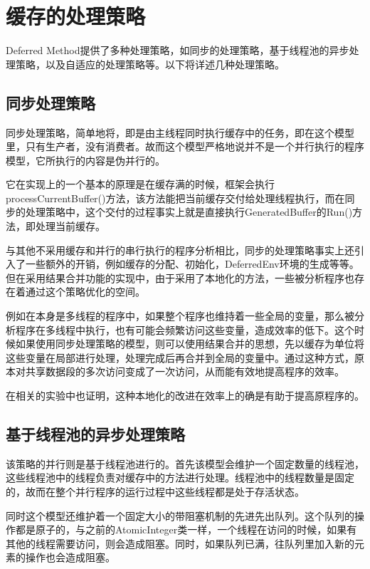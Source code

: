 \section{缓存的处理策略}

Deferred Method提供了多种处理策略，如同步的处理策略，基于线程池的异步处理策略，以及自适应的处理策略等。以下将详述几种处理策略。

\subsection{同步处理策略}

同步处理策略，简单地将，即是由主线程同时执行缓存中的任务，即在这个模型里，只有生产者，没有消费者。故而这个模型严格地说并不是一个并行执行的程序模型，它所执行的内容是伪并行的。

它在实现上的一个基本的原理是在缓存满的时候，框架会执行processCurrentBuffer()方法，该方法能把当前缓存交付给处理线程执行，而在同步的处理策略中，这个交付的过程事实上就是直接执行GeneratedBuffer的Run()方法，即处理当前缓存。

与其他不采用缓存和并行的串行执行的程序分析相比，同步的处理策略事实上还引入了一些额外的开销，例如缓存的分配、初始化，DeferredEnv环境的生成等等。但在采用结果合并功能的实现中，由于采用了本地化的方法，一些被分析程序也存在着通过这个策略优化的空间。

例如在本身是多线程的程序中，如果整个程序也维持着一些全局的变量，那么被分析程序在多线程中执行，也有可能会频繁访问这些变量，造成效率的低下。这个时候如果使用同步处理策略的模型，则可以使用结果合并的思想，先以缓存为单位将这些变量在局部进行处理，处理完成后再合并到全局的变量中。通过这种方式，原本对共享数据段的多次访问变成了一次访问，从而能有效地提高程序的效率。

在相关的实验中也证明，这种本地化的改进在效率上的确是有助于提高原程序的。

\subsection{基于线程池的异步处理策略}

该策略的并行则是基于线程池进行的。首先该模型会维护一个固定数量的线程池，这些线程池中的线程负责对缓存中的方法进行处理。线程池中的线程数量是固定的，故而在整个并行程序的运行过程中这些线程都是处于存活状态。

同时这个模型还维护着一个固定大小的带阻塞机制的先进先出队列。这个队列的操作都是原子的，与之前的AtomicInteger类一样，一个线程在访问的时候，如果有其他的线程需要访问，则会造成阻塞。同时，如果队列已满，往队列里加入新的元素的操作也会造成阻塞。

